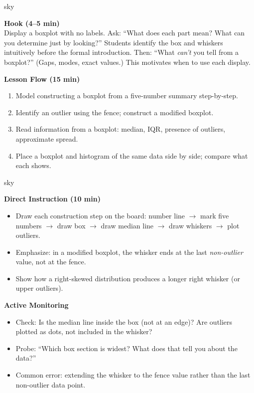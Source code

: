\documentclass[10pt]{article}
\begin{document}
\begin{skillbox}{sky}
\begin{minipage}[t]{0.48\linewidth}
    \textbf{Hook (4--5 min)}\\
    Display a boxplot with no labels. Ask: ``What does each part mean? What can you determine just by looking?'' Students identify the box and whiskers intuitively before the formal introduction. Then: ``What \textit{can't} you tell from a boxplot?'' (Gaps, modes, exact values.) This motivates when to use each display.
\end{minipage}
\hfill
\begin{minipage}[t]{0.48\linewidth}
    \textbf{Lesson Flow (15 min)}
    \begin{enumerate}
        \item Model constructing a boxplot from a five-number summary step-by-step.
        \item Identify an outlier using the fence; construct a modified boxplot.
        \item Read information from a boxplot: median, IQR, presence of outliers, approximate spread.
        \item Place a boxplot and histogram of the same data side by side; compare what each shows.
    \end{enumerate}
\end{minipage}
\end{skillbox}

\begin{skillbox}{sky}
\begin{minipage}[t]{0.48\linewidth}
    \textbf{Direct Instruction (10 min)}
    \begin{itemize}
        \item Draw each construction step on the board: number line $\to$ mark five numbers $\to$ draw box $\to$ draw median line $\to$ draw whiskers $\to$ plot outliers.
        \item Emphasize: in a modified boxplot, the whisker ends at the last \textit{non-outlier} value, not at the fence.
        \item Show how a right-skewed distribution produces a longer right whisker (or upper outliers).
    \end{itemize}
\end{minipage}
\hfill
\begin{minipage}[t]{0.48\linewidth}
    \textbf{Active Monitoring}
    \begin{itemize}
        \item Check: Is the median line inside the box (not at an edge)? Are outliers plotted as dots, not included in the whisker?
        \item Probe: ``Which box section is widest? What does that tell you about the data?''
        \item Common error: extending the whisker to the fence value rather than the last non-outlier data point.
    \end{itemize}
\end{minipage}
\end{skillbox}
\end{document}
